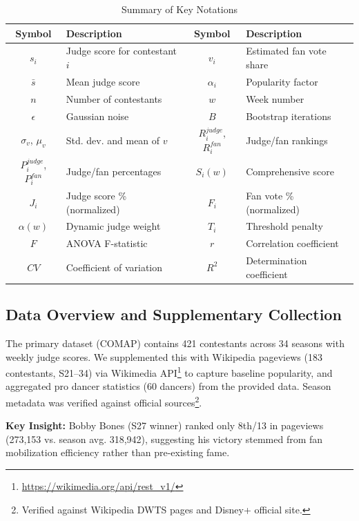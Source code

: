 \documentclass{mcmthesis}
\begin{document}
\begin{table}[H]
\centering
\caption{Summary of Key Notations}
\label{tab:notations}
\footnotesize
\setlength{\tabcolsep}{4pt}
\begin{tabular}{clcl}
\toprule
\textbf{Symbol} & \textbf{Description} & \textbf{Symbol} & \textbf{Description} \\
\midrule
$s_i$ & Judge score for contestant $i$ & $v_i$ & Estimated fan vote share \\
$\bar{s}$ & Mean judge score & $\alpha_i$ & Popularity factor \\
$n$ & Number of contestants & $w$ & Week number \\
$\epsilon$ & Gaussian noise & $B$ & Bootstrap iterations \\
$\sigma_v$, $\mu_v$ & Std. dev. and mean of $v$ & $R_i^{judge}$, $R_i^{fan}$ & Judge/fan rankings \\
$P_i^{judge}$, $P_i^{fan}$ & Judge/fan percentages & $S_i(w)$ & Comprehensive score \\
$J_i$ & Judge score \% (normalized) & $F_i$ & Fan vote \% (normalized) \\
$\alpha(w)$ & Dynamic judge weight & $T_i$ & Threshold penalty \\
$F$ & ANOVA F-statistic & $r$ & Correlation coefficient \\
$CV$ & Coefficient of variation & $R^2$ & Determination coefficient \\
\bottomrule
\end{tabular}
\end{table}

\subsection{Data Overview and Supplementary Collection}

The primary dataset (COMAP) contains 421 contestants across 34 seasons with weekly judge scores. We supplemented this with Wikipedia pageviews (183 contestants, S21--34) via Wikimedia API\footnote{\url{https://wikimedia.org/api/rest_v1/}} to capture baseline popularity, and aggregated pro dancer statistics (60 dancers) from the provided data. Season metadata was verified against official sources\footnote{Verified against Wikipedia DWTS pages and Disney+ official site.}.

\textbf{Key Insight:} Bobby Bones (S27 winner) ranked only 8th/13 in pageviews (273,153 vs. season avg. 318,942), suggesting his victory stemmed from fan mobilization efficiency rather than pre-existing fame.
\end{document}
